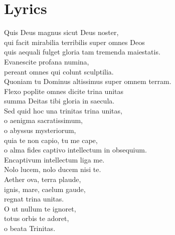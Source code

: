 \documentclass[shorttitlesize=55,tocstyle=none]{ees}
\begin{document}
\eesTitlePage


\ifPrintFrontMatter
\cleardoublepage
\chapter{Lyrics}
Quis Deus magnus sicut Deus noster,\\
qui facit mirabilia terribilis super omnes Deos\\
quis aequali fulget gloria tam tremenda maiestatis. \\
Evanescite profana numina,\\
pereant omnes qui colunt sculptilia.\\
Quoniam tu Dominus altissimus super omnem terram. \\
Flexo poplite omnes dicite trina unitas\\
summa Deitas tibi gloria in saecula. \\
Sed quid hoc una trinitas trina unitas,\\
o aenigma sacratissimum,\\
o abyssus mysteriorum,\\
quia te non capio, tu me cape,\\
o alma fides captivo intellectum in obsequium. \\
Encaptivum intellectum liga me.\\
Nolo lucem, nolo ducem nisi te. \\
Aether ova, terra plaude,\\
ignis, mare, caelum gaude,\\
regnat trina unitas.\\
O ut nullum te ignoret,\\
totus orbis te adoret,\\
o beata Trinitas.
\fi

\eesToc{}

\eesScore
\end{document}
